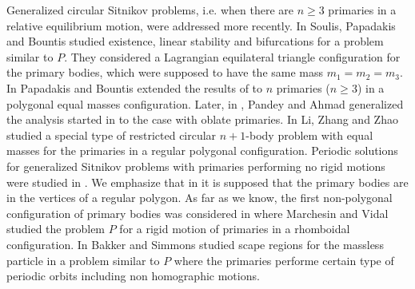 \documentclass[smallcondensed]{svjour3}
\begin{document}
Generalized circular Sitnikov problems, i.e. when there are $n\geq 3$ primaries in a relative equilibrium motion,   were addressed more recently.
In \cite{soulis2008periodic} Soulis, Papadakis and Bountis studied existence, linear stability and bifurcations for a problem similar to $P$. They considered  a Lagrangian equilateral triangle configuration for the primary bodies, which were supposed to have the same mass $m_1=m_2=m_3$. In \cite{bountis2009stability} Papadakis and Bountis extended the results of \cite{soulis2008periodic} to $n$ primaries ($n\geq 3$) in a polygonal equal masses configuration. Later,  in \cite{pandey2013periodic}, Pandey and Ahmad generalized  the analysis started in \cite{soulis2008periodic} to the case with oblate primaries.
In \cite{li2013characterization} Li, Zhang and Zhao studied a special type of
restricted circular $n+1$-body problem  with equal masses for the primaries in a regular polygonal configuration. Periodic solutions for generalized Sitnikov problems with primaries performing  no rigid motions were studied in \cite{pustyl1990certain,rivera2013periodic}. We emphasize that in
\cite{bountis2009stability,li2013characterization,pandey2013periodic,pustyl1990certain,rivera2013periodic,soulis2008periodic} it is supposed that
the primary bodies are in the vertices of a regular polygon.
As far as we know, the first non-polygonal configuration of primary bodies was considered in \cite{marchesin2013spatial} where  Marchesin and Vidal studied the problem $P$ for a rigid motion  of primaries in a  rhomboidal configuration.
 In \cite{bakker2015separating} Bakker and Simmons studied scape regions for the massless particle in a problem similar to $P$ where the primaries performe certain type of periodic orbits including non homographic motions.
\end{document}
